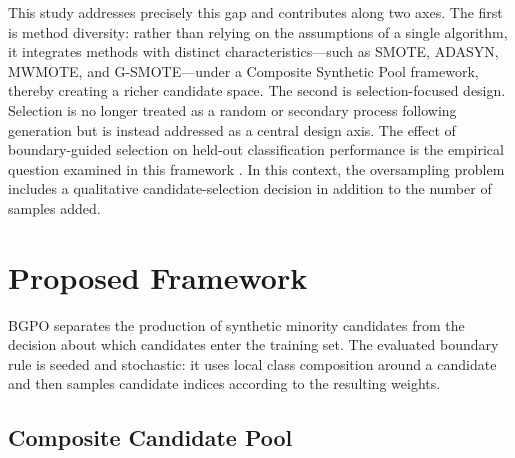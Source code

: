 \documentclass[pdflatex]{sn-jnl}
\begin{document}
This study addresses precisely this gap and contributes along two axes. The first is method diversity: rather than relying on the assumptions of a single algorithm, it integrates methods with distinct characteristics---such as SMOTE, ADASYN, MWMOTE, and G-SMOTE---under a Composite Synthetic Pool framework, thereby creating a richer candidate space. The second is selection-focused design. Selection is no longer treated as a random or secondary process following generation but is instead addressed as a central design axis. The effect of boundary-guided selection on held-out classification performance is the empirical question examined in this framework \cite{ref10} \cite{ref11} \cite{ref12}. In this context, the oversampling problem includes a qualitative candidate-selection decision in addition to the number of samples added.

\section{Proposed Framework}\label{sec:3}

BGPO separates the production of synthetic minority candidates from the decision about which candidates enter the training set. The evaluated boundary rule is seeded and stochastic: it uses local class composition around a candidate and then samples candidate indices according to the resulting weights.

\subsection{Composite Candidate Pool}
\end{document}
